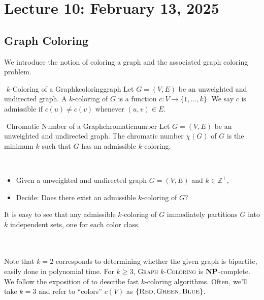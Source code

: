 \section{Lecture 10: February 13, 2025}

    \subsection{Graph Coloring}

        We introduce the notion of coloring a graph and the associated graph coloring problem. 
        \begin{definition}{\Stop\,\,\(k\)-Coloring of a Graph}{kcoloringgraph}
            Let \(G=(V,E)\) be an unweighted and undirected graph. A \(k\)-coloring of \(G\) is a function \(c:V\to\{1,\ldots,k\}\). We say \(c\) is admissible if \(c(u)\neq c(v)\) whenever \((u,v)\in E\).
        \end{definition}
        \begin{definition}{\Stop\,\,Chromatic Number of a Graph}{chromaticnumber}
            Let \(G=(V,E)\) be an unweighted and undirected graph. The chromatic number \(\chi(G)\) of \(G\) is the minimum \(k\) such that \(G\) has an admissible \(k\)-coloring.
        \end{definition}
        \begin{compprob} \label{prob:graphcolor}
            \vphantom
            \\
            \begin{itemize}
                \item Given a unweighted and undirected graph \(G=(V,E)\) and \(k\in\mathbb{Z}^+\),
                \item Decide: Does there exist an admissible \(k\)-coloring of \(G\)?
            \end{itemize}
        \end{compprob}
        \begin{remark*}
            It is easy to see that any admissible \(k\)-coloring of \(G\) immediately partitions \(G\) into \(k\) independent sets, one for each color class.
        \end{remark*}
        \vphantom
        \\
        \\
        Note that \(k=2\) corresponds to determining whether the given graph is bipartite, easily done in polynomial time. For \(k\geq 3\), \textsc{Graph \(k\)-Coloring} is \(\mathbf{NP}\)-complete. We follow the exposition of \cite{feige2011colorlecture} to describe fast \(k\)-coloring algorithms. Often, we'll take \(k=3\) and refer to ``colors'' \(c(V)\) as \(\{\textsc{Red}, \textsc{Green}, \textsc{Blue}\}\).
